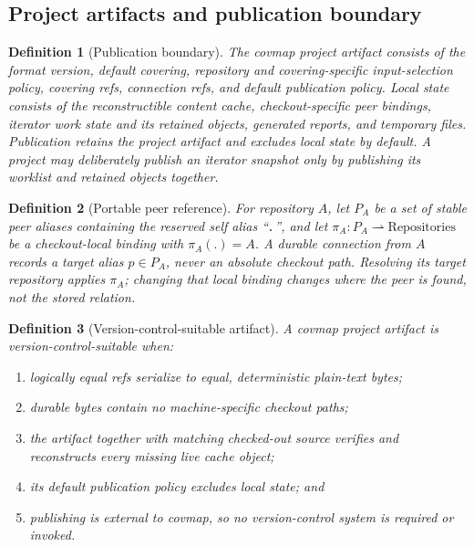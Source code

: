 \documentclass[11pt,a4paper]{article}
\newtheorem{definition}{Definition}[section]
\begin{document}
\subsection{Project artifacts and publication boundary}
\label{sec:project-artifacts}

\begin{definition}[Publication boundary]\label{def:publication-boundary}
The \emph{covmap project artifact} consists of the format version, default
covering, repository and covering-specific input-selection policy, covering
refs, connection refs, and default publication policy. \emph{Local state}
consists of the reconstructible content cache, checkout-specific peer
bindings, iterator work state and its retained objects, generated reports, and
temporary files. Publication retains the project artifact and excludes local
state by default. A project may deliberately publish an iterator snapshot only
by publishing its worklist and retained objects together.
\end{definition}

\begin{definition}[Portable peer reference]\label{def:peer-reference}
For repository $A$, let $P_A$ be a set of stable peer aliases containing the
reserved self alias ``\texttt{.}'', and let
$\pi_A : P_A \rightharpoonup \mathrm{Repositories}$ be a checkout-local
binding with $\pi_A(\texttt{.}) = A$. A durable connection from $A$ records a
target alias $p \in P_A$, never an absolute checkout path. Resolving its target
repository applies $\pi_A$; changing that local binding changes where the peer
is found, not the stored relation.
\end{definition}

\begin{definition}[Version-control-suitable artifact]
\label{def:version-control-artifact}
A covmap project artifact is \emph{version-control-suitable} when:
\begin{enumerate}[label=(V\arabic*),leftmargin=3em]
\item logically equal refs serialize to equal, deterministic plain-text bytes;
\item durable bytes contain no machine-specific checkout paths;
\item the artifact together with matching checked-out source verifies and
      reconstructs every missing live cache object;
\item its default publication policy excludes local state; and
\item publishing is external to covmap, so no version-control system is
      required or invoked.
\end{enumerate}
\end{definition}
\end{document}
